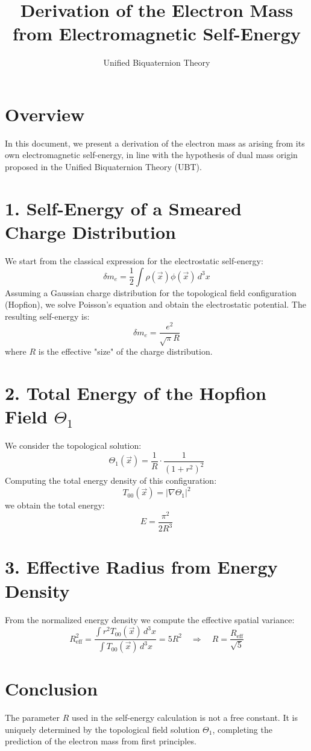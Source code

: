 \documentclass[11pt]{article}
\title{Derivation of the Electron Mass from Electromagnetic Self-Energy}
\author{Unified Biquaternion Theory}
\date{}
\begin{document}
\maketitle

\section*{Overview}

In this document, we present a derivation of the electron mass as arising from its own electromagnetic self-energy, in line with the hypothesis of dual mass origin proposed in the Unified Biquaternion Theory (UBT).

\section*{1. Self-Energy of a Smeared Charge Distribution}

We start from the classical expression for the electrostatic self-energy:
\[
\delta m_e = \frac{1}{2} \int \rho(\vec{x}) \phi(\vec{x})\, d^3x
\]
Assuming a Gaussian charge distribution for the topological field configuration (Hopfion), we solve Poisson's equation and obtain the electrostatic potential. The resulting self-energy is:
\[
\delta m_e = \frac{e^2}{\sqrt{\pi} R}
\]
where \( R \) is the effective "size" of the charge distribution.

\section*{2. Total Energy of the Hopfion Field \(\Theta_1\)}

We consider the topological solution:
\[
\Theta_1(\vec{x}) = \frac{1}{R} \cdot \frac{1}{(1 + r^2)^2}
\]
Computing the total energy density of this configuration:
\[
T_{00}(\vec{x}) = |\nabla \Theta_1|^2
\]
we obtain the total energy:
\[
E = \frac{\pi^2}{2 R^3}
\]

\section*{3. Effective Radius from Energy Density}

From the normalized energy density we compute the effective spatial variance:
\[
R_{\text{eff}}^2 = \frac{\int r^2 T_{00}(\vec{x})\, d^3x}{\int T_{00}(\vec{x})\, d^3x} = 5R^2
\quad \Rightarrow \quad R = \frac{R_{\text{eff}}}{\sqrt{5}}
\]

\section*{Conclusion}

The parameter \( R \) used in the self-energy calculation is not a free constant. It is uniquely determined by the topological field solution \(\Theta_1\), completing the prediction of the electron mass from first principles.
\end{document}
